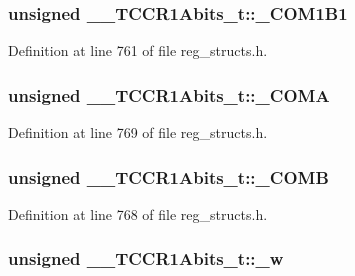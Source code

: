 \hypertarget{union_____t_c_c_r1_abits__t_af5c46cba9c89af19b913166047d4c298}{
\subsubsection[{\+\_\+\+C\+O\+M1\+B1}]{\setlength{\rightskip}{0pt plus 5cm}unsigned \+\_\+\+\_\+\+T\+C\+C\+R1\+Abits\+\_\+t\+::\+\_\+\+C\+O\+M1\+B1}}\label{union_____t_c_c_r1_abits__t_af5c46cba9c89af19b913166047d4c298}


Definition at line 761 of file reg\+\_\+structs.\+h.

\hypertarget{union_____t_c_c_r1_abits__t_a3b830264ef9b6a65c940f38fccde1eb2}{
\subsubsection[{\+\_\+\+C\+O\+M\+A}]{\setlength{\rightskip}{0pt plus 5cm}unsigned \+\_\+\+\_\+\+T\+C\+C\+R1\+Abits\+\_\+t\+::\+\_\+\+C\+O\+M\+A}}\label{union_____t_c_c_r1_abits__t_a3b830264ef9b6a65c940f38fccde1eb2}


Definition at line 769 of file reg\+\_\+structs.\+h.

\hypertarget{union_____t_c_c_r1_abits__t_aac14d2ce9eef209c034c717d8e807e65}{
\subsubsection[{\+\_\+\+C\+O\+M\+B}]{\setlength{\rightskip}{0pt plus 5cm}unsigned \+\_\+\+\_\+\+T\+C\+C\+R1\+Abits\+\_\+t\+::\+\_\+\+C\+O\+M\+B}}\label{union_____t_c_c_r1_abits__t_aac14d2ce9eef209c034c717d8e807e65}


Definition at line 768 of file reg\+\_\+structs.\+h.

\hypertarget{union_____t_c_c_r1_abits__t_a6b8d6d0134721dcb23f82cf341923656}{
\subsubsection[{\+\_\+w}]{\setlength{\rightskip}{0pt plus 5cm}unsigned \+\_\+\+\_\+\+T\+C\+C\+R1\+Abits\+\_\+t\+::\+\_\+w}}\label{union_____t_c_c_r1_abits__t_a6b8d6d0134721dcb23f82cf341923656}


